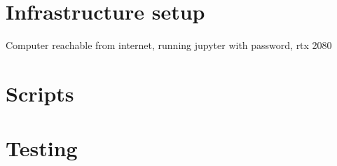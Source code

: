 \section{Infrastructure setup}
Computer reachable from internet, running jupyter with password,
rtx 2080

\section{Scripts}

\section{Testing}